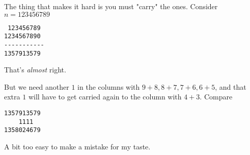 \documentclass[11pt, oneside]{article}
\begin{document}
The thing that makes it hard is you must "carry" the ones.  Consider $n=123456789$

\begin{verbatim}
 123456789
1234567890
-----------
1357913579
\end{verbatim}

That's \emph{almost} right.

But we need another $1$ in the columns with $9+8, 8+7, 7+6, 6+5$, and that extra $1$ will have to get carried again to the column with $4+3$.  Compare

\begin{verbatim}
1357913579
    1111
1358024679
\end{verbatim}

A bit too easy to make a mistake for my taste.
\end{document}
